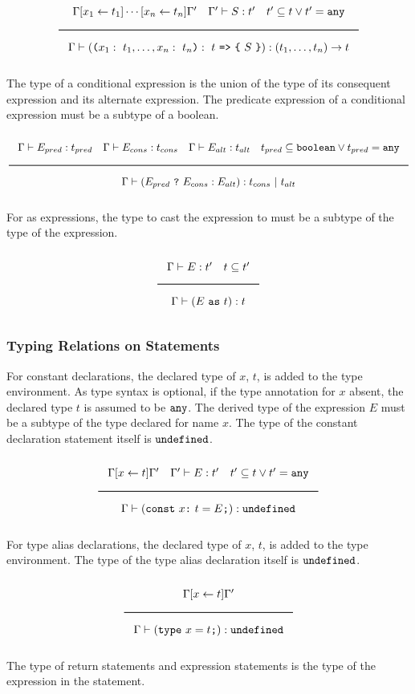 \noindent
\[
  \Rule{\Gamma [x_1 \leftarrow t_1] \cdots [x_n \leftarrow t_n] \Gamma' \quad \Gamma' \vdash S : t' \quad t' \subseteq t \vee t' = \Any}{
    \Gamma \vdash ( \Lp  x_1:\ t_1, \ldots, x_n:\ t_n \Rp :\ t\ \texttt{=>}\ \Lc\ S\ \Rc) : (t_1, \ldots, t_n) \rightarrow t}  
\]
\noindent

The type of a conditional expression is the union of the type of its consequent expression and its alternate expression.
The predicate expression of a conditional expression must be a subtype of a boolean.

\noindent
\[
  \Rule{\Gamma \vdash E_{pred} : t_{pred} \quad \Gamma \vdash E_{cons} : t_{cons} \quad \Gamma \vdash E_{alt} : t_{alt}
    \quad t_{pred} \subseteq \Bool \vee t_{pred} = \Any}{\Gamma \vdash (E_{pred}\ \texttt{?}\ E_{cons} : E_{alt}) : t_{cons}\ |\ t_{alt}}
\]
\noindent

For as expressions, the type to cast the expression to must be a subtype of the type of the expression.

\noindent
\[
  \Rule{\Gamma \vdash E : t' \quad t \subseteq t'}{\Gamma \vdash (E\ \texttt{as}\ t) : t}  
\]
\noindent

\subsubsection{Typing Relations on Statements}

For constant declarations, the declared type of $x$, $t$, is added to the type environment.
As type syntax is optional, if the type annotation for $x$ absent, the declared type $t$ is assumed to be $\texttt{any}$.
The derived type of the expression $E$ must be a subtype of the type declared for name $x$.
The type of the constant declaration statement itself is $\texttt{undefined}$.

\noindent
\[
  \Rule{\Gamma [x \leftarrow t] \Gamma' \quad \Gamma' \vdash E : t' \quad t' \subseteq t \vee t' = \Any}{
    \Gamma \vdash (\texttt{const}\ x \texttt{:}\ t = E\texttt{;}) : \Undefined}
\]
\noindent

For type alias declarations, the declared type of $x$, $t$, is added to the type environment.
The type of the type alias declaration itself is $\texttt{undefined}$.

\noindent
\[
  \Rule{\Gamma [x \leftarrow t] \Gamma'}{\Gamma \vdash (\texttt{type}\ x = t\texttt{;}) : \Undefined}
\]
\noindent

The type of return statements and expression statements is the type of the expression in the statement.

